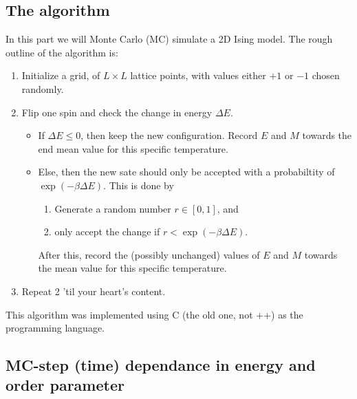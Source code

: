 \documentclass[11pt,letter, swedish, english
]{article}
\newcommand{\DE}{\ensuremath{\Delta{E}}}
\begin{document}
\subsection{The algorithm}
In this part we will Monte Carlo (MC) simulate a 2D Ising model. The
rough outline of the algorithm is:
\begin{enumerate}
\item Initialize a grid, of $L\times L$ lattice points, with values
either $+1$ or $-1$ chosen randomly.
\item Flip one spin and check the change in energy $\DE$.
\begin{itemize}
\item If $\DE\le0$, then keep the new configuration. Record $E$ and
$M$ towards the end mean value for this specific
temperature\footnotemark{}.
\item Else, then the new sate should only be accepted with a
probabiltity of $\exp(-\beta\DE)$. This is done by
\begin{enumerate}
\item Generate a random number $r\in[0, 1]$, and
\item only accept the change if $r<\exp(-\beta\DE)$.
\end{enumerate}
\addtocounter{footnote}{-1}
After this, record the (possibly unchanged) values of $E$ and $M$
towards the mean value for this specific temperature\footnotemark{}. 
\end{itemize}
\item Repeat 2 'til your heart's content.
\end{enumerate}
This algorithm was implemented using C (the old one, not ++) as the
programming language. 






\setcounter{subsection}{0}
\renewcommand{\thesubsection}{\arabic{section} (\alph{subsection})}
\renewcommand{\thesubsubsection}{\arabic{section} (\alph{subsection},\,\roman{subsubsection})}
\subsection{MC-step (time) dependance in energy and order parameter}
\end{document}
